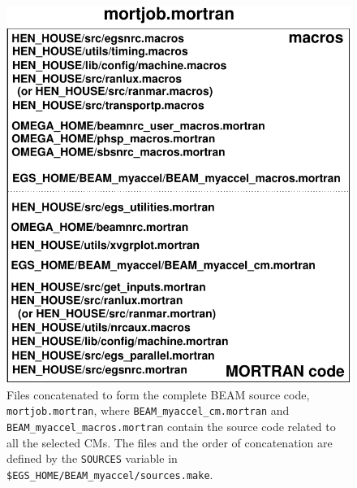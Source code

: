 \documentclass[12pt,twoside]{article}
\begin{document}
\begin{figure}[htb]
\begin{center}
\leavevmode
\mbox{}\hspace{0cm}
  
 
  
\includegraphics{figures/mortjob-mortran}
\caption[Files making up the complete BEAM source code.]
{Files concatenated to form the complete BEAM source code,
{\tt mortjob.mortran}, where {\tt BEAM\_myaccel\_cm.mortran}
and {\tt BEAM\_myaccel\_macros.mortran} contain
the source code related to all the selected CMs.  The files and
the order of concatenation are defined by the {\tt SOURCES} variable
in {\tt \$EGS\_HOME/BEAM\_myaccel/sources.make}.}
\label{fig_mortjob}
\end{center}
\end{figure}
\end{document}
